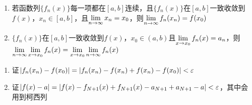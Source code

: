\begin{example}
\begin{enumerate}
	\item 若函数列$\{f_n(x)\}$每一项都在$[a,b]$连续，且$\{f_n(x)\}$在$[a,b]$一致收敛到$f(x)$，$x_n\in[a,b]$，且$\displaystyle\lim_{n\to\infty}x_n=x_0$，则$\displaystyle\lim_{n\to\infty}f_n(x_n)=f(x_0)$
	\item $\{f_n(x)\}$在$[a,b]$一致收敛到$f(x)$，$x_0\in(a,b)$且$\displaystyle\lim_{x\to x_0}f_n(x)=a_n$，则$\displaystyle\displaystyle\lim_{n\to\infty}\lim_{x\to x_0}f_n(x)=\lim_{x\to x_0}\displaystyle\lim_{n\to\infty}f_n(x)$
\end{enumerate}
\end{example}
\begin{analysis}
\begin{enumerate}
	\item 证$|f_n(x_n)-f(x_0)|=|f_n(x_n)-f(x_n)+f(x_n)-f(x_0)|<\varepsilon$
	\item 证$|f(x)-a|=|f(x)-f_{N+1}(x)+f_{N+1}(x)-a_{N+1}+a_{N+1}-a|<\varepsilon$，其中会用到柯西列
\end{enumerate}
\end{analysis}


